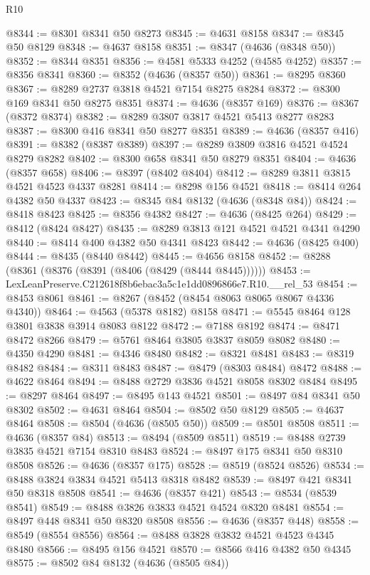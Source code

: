 \begin{lexlean}{R10}
\begin{coremodule}
@8344 := @8301 @8341 @50 @8273
@8345 := @4631 @8158
@8347 := @8345 @50 @8129
@8348 := @4637 @8158
@8351 := @8347 (@4636 (@8348 @50))
@8352 := @8344 @8351
@8356 := @4581 @5333 @4252 (@4585 @4252)
@8357 := @8356 @8341
@8360 := @8352 (@4636 (@8357 @50))
@8361 := @8295 @8360
@8367 := @8289 @2737 @3818 @4521 @7154 @8275 @8284
@8372 := @8300 @169 @8341 @50 @8275 @8351
@8374 := @4636 (@8357 @169)
@8376 := @8367 (@8372 @8374)
@8382 := @8289 @3807 @3817 @4521 @5413 @8277 @8283
@8387 := @8300 @416 @8341 @50 @8277 @8351
@8389 := @4636 (@8357 @416)
@8391 := @8382 (@8387 @8389)
@8397 := @8289 @3809 @3816 @4521 @4524 @8279 @8282
@8402 := @8300 @658 @8341 @50 @8279 @8351
@8404 := @4636 (@8357 @658)
@8406 := @8397 (@8402 @8404)
@8412 := @8289 @3811 @3815 @4521 @4523 @4337 @8281
@8414 := @8298 @156 @4521
@8418 := @8414 @264 @4382 @50 @4337
@8423 := @8345 @84 @8132 (@4636 (@8348 @84))
@8424 := @8418 @8423
@8425 := @8356 @4382
@8427 := @4636 (@8425 @264)
@8429 := @8412 (@8424 @8427)
@8435 := @8289 @3813 @121 @4521 @4521 @4341 @4290
@8440 := @8414 @400 @4382 @50 @4341 @8423
@8442 := @4636 (@8425 @400)
@8444 := @8435 (@8440 @8442)
@8445 := @4656 @8158
@8452 := @8288 (@8361 (@8376 (@8391 (@8406 (@8429 (@8444 @8445))))))
@8453 := LexLeanPreserve.C212618f8b6ebac3a5c1e1dd0896866e7.R10.__rel_53
@8454 := @8453 @8061
@8461 := @8267 (@8452 (@8454 @8063 @8065 @8067 @4336 @4340))
@8464 := @4563 (@5378 @8182) @8158
@8471 := @5545 @8464 @128 @3801 @3838 @3914 @8083 @8122
@8472 := @7188 @8192
@8474 := @8471 @8472 @8266
@8479 := @5761 @8464 @3805 @3837 @8059 @8082
@8480 := @4350 @4290
@8481 := @4346 @8480
@8482 := @8321 @8481
@8483 := @8319 @8482
@8484 := @8311 @8483
@8487 := @8479 (@8303 @8484) @8472
@8488 := @4622 @8464
@8494 := @8488 @2729 @3836 @4521 @8058 @8302 @8484
@8495 := @8297 @8464
@8497 := @8495 @143 @4521
@8501 := @8497 @84 @8341 @50 @8302
@8502 := @4631 @8464
@8504 := @8502 @50 @8129
@8505 := @4637 @8464
@8508 := @8504 (@4636 (@8505 @50))
@8509 := @8501 @8508
@8511 := @4636 (@8357 @84)
@8513 := @8494 (@8509 @8511)
@8519 := @8488 @2739 @3835 @4521 @7154 @8310 @8483
@8524 := @8497 @175 @8341 @50 @8310 @8508
@8526 := @4636 (@8357 @175)
@8528 := @8519 (@8524 @8526)
@8534 := @8488 @3824 @3834 @4521 @5413 @8318 @8482
@8539 := @8497 @421 @8341 @50 @8318 @8508
@8541 := @4636 (@8357 @421)
@8543 := @8534 (@8539 @8541)
@8549 := @8488 @3826 @3833 @4521 @4524 @8320 @8481
@8554 := @8497 @448 @8341 @50 @8320 @8508
@8556 := @4636 (@8357 @448)
@8558 := @8549 (@8554 @8556)
@8564 := @8488 @3828 @3832 @4521 @4523 @4345 @8480
@8566 := @8495 @156 @4521
@8570 := @8566 @416 @4382 @50 @4345
@8575 := @8502 @84 @8132 (@4636 (@8505 @84))

\end{coremodule}
\end{lexlean}
